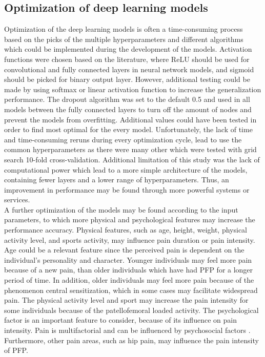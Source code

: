 \subsection{Optimization of deep learning models}
Optimization of the deep learning models is often a time-consuming process based on the picks of the multiple hyperparameters and different algorithms which could be implemented during the development of the models.
Activation functions were chosen based on the literature, where ReLU should be used for convolutional and fully connected layers in neural network models, and sigmoid should be picked for binary output layer. However, additional testing could be made by using softmax or linear activation function to increase the generalization performance. The dropout algorithm was set to the default 0.5 and used in all models between the fully connected layers to turn off the amount of nodes and prevent the models from overfitting. Additional values could have been tested in order to find most optimal for the every model.
Unfortunately, the lack of time and time-consuming reruns during every optimization cycle, lead to use the common hyperparameters as there were many other which were tested with grid search 10-fold cross-validation.
\noindent
Additional limitation of this study was the lack of computational power which lead to a more simple architecture of the models, containing fewer layers and a lower range of hyperparameters. Thus, an improvement in performance may be found through more powerful systems or services. \\
\noindent
A further optimization of the models may be found according to the input parameters, to which more physical and psychological features may increase the performance accuracy. Physical features, such as age, height, weight, physical activity level, and sports activity, may influence pain duration or pain intensity. Age could be a relevant feature since the perceived pain is dependent on the individual's personality and character. Younger individuals may feel more pain because of a new pain, than older individuals which have had PFP for a longer period of time. In addition, older individuals may feel more pain because of the phenomenon central sensitization, which in some cases may facilitate widespread pain. The physical activity level and sport may increase the pain intensity for some individuals because of the patellofemoral loaded activity. The psychological factor is an important feature to consider, because of its influence on pain intensity. Pain is multifactorial and can be influenced by psychosocial factors \citep{Roos2003}. Furthermore, other pain areas, such as hip pain, may influence the pain intensity of PFP.


